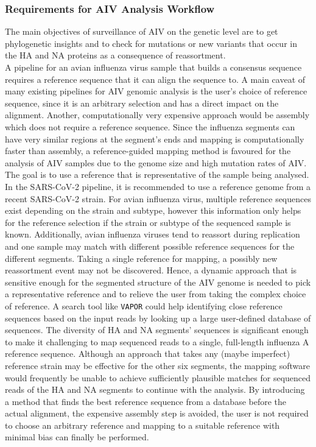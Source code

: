 \subsubsection{Requirements for AIV Analysis Workflow}
The main objectives of surveillance of \ac{AIV} on the genetic level are to get phylogenetic insights and to check for mutations or new variants that occur in the \ac{HA} and \ac{NA} proteins as a consequence of reassortment. \\
A pipeline for an avian influenza virus sample that builds a consensus sequence requires a reference sequence that it can align the sequence to. A main caveat of many existing pipelines for \ac{AIV} genomic analysis is the user's choice of reference sequence, since it is an arbitrary selection and has a direct impact on the alignment. Another, computationally very expensive approach would be assembly which does not require a reference sequence. Since the influenza segments can have very similar regions at the segment's ends and mapping is computationally faster than assembly, a reference-guided mapping method is favoured for the analysis of \ac{AIV} samples due to the genome size and high mutation rates of \ac{AIV}. The goal is to use a reference that is representative of the sample being analysed. In the \ac{SARS-CoV-2} pipeline, it is recommended to use a reference genome from a recent \ac{SARS-CoV-2} strain. For avian influenza virus, multiple reference sequences exist depending on the strain and subtype, however this information only helps for the reference selection if the strain or subtype of the sequenced sample is known. Additionally, avian influenza viruses tend to reassort during replication and one sample may match with different possible reference sequences for the different segments. Taking a single reference for mapping, a possibly new reassortment event may not be discovered. Hence, a dynamic approach that is sensitive enough for the segmented structure of the \ac{AIV} genome is needed to pick a representative reference and to relieve the user from taking the complex choice of reference. A search tool like \texttt{VAPOR} could help identifying close reference sequences based on the input reads by looking up a large user-defined database of sequences. The diversity of \ac{HA} and \ac{NA} segments' sequences is significant enough to make it challenging to map sequenced reads to a single, full-length influenza A reference sequence. Although an approach that takes any (maybe imperfect) reference strain may be effective for the other six segments, the mapping software would frequently be unable to achieve sufficiently plausible matches for sequenced reads of the \ac{HA} and \ac{NA} segments to continue with the analysis. By introducing a method that finds the best reference sequence from a database before the actual alignment, the expensive assembly step is avoided, the user is not required to choose an arbitrary reference and mapping to a suitable reference with minimal bias can finally be performed. \\
